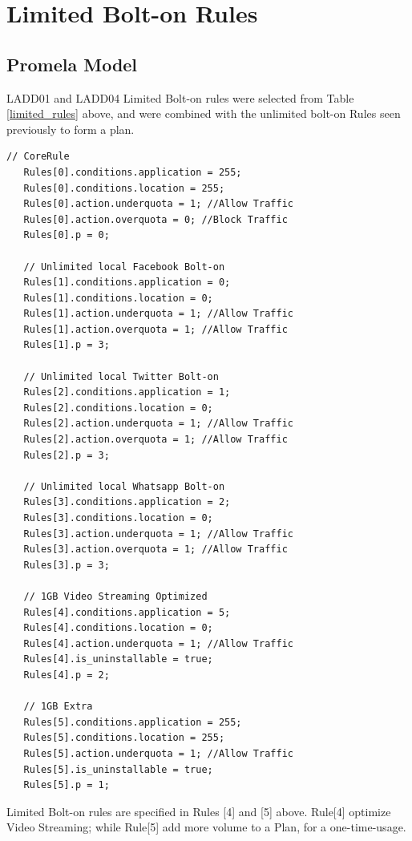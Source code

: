 \section{Limited Bolt-on Rules}
\subsection{Promela Model}
\noindent
LADD01 and LADD04 Limited Bolt-on rules were selected from Table \ref{limited_rules} above, and were combined with the unlimited bolt-on Rules seen previously to form a plan.  

\singlespacing
\begin{lstlisting}[caption=Core-Rules-based Plan Model,
  label=CoreRules_Listing]
   // CoreRule
   Rules[0].conditions.application = 255;
   Rules[0].conditions.location = 255;
   Rules[0].action.underquota = 1; //Allow Traffic
   Rules[0].action.overquota = 0; //Block Traffic
   Rules[0].p = 0; 
   
   // Unlimited local Facebook Bolt-on
   Rules[1].conditions.application = 0;
   Rules[1].conditions.location = 0;
   Rules[1].action.underquota = 1; //Allow Traffic
   Rules[1].action.overquota = 1; //Allow Traffic
   Rules[1].p = 3;

   // Unlimited local Twitter Bolt-on
   Rules[2].conditions.application = 1;
   Rules[2].conditions.location = 0;
   Rules[2].action.underquota = 1; //Allow Traffic
   Rules[2].action.overquota = 1; //Allow Traffic
   Rules[2].p = 3;

   // Unlimited local Whatsapp Bolt-on
   Rules[3].conditions.application = 2;
   Rules[3].conditions.location = 0;
   Rules[3].action.underquota = 1; //Allow Traffic
   Rules[3].action.overquota = 1; //Allow Traffic
   Rules[3].p = 3;

   // 1GB Video Streaming Optimized
   Rules[4].conditions.application = 5;
   Rules[4].conditions.location = 0;
   Rules[4].action.underquota = 1; //Allow Traffic
   Rules[4].is_uninstallable = true;
   Rules[4].p = 2;

   // 1GB Extra
   Rules[5].conditions.application = 255;
   Rules[5].conditions.location = 255;
   Rules[5].action.underquota = 1; //Allow Traffic
   Rules[5].is_uninstallable = true;
   Rules[5].p = 1;
   \end{lstlisting}
\doublespacing

Limited Bolt-on rules are specified in Rules [4] and [5] above. Rule[4] optimize Video Streaming; while Rule[5] add more volume to a Plan, for a one-time-usage. 

